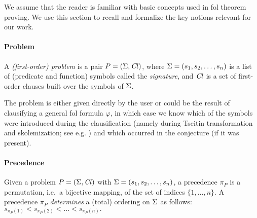 \documentclass[a4paper]{easychair}
\begin{document}

We assume that the reader is familiar with basic concepts used in \gls*{fol} theorem proving.
We use this section to recall and formalize the key notions relevant for our work.



\paragraph{Problem}
A \emph{(first-order) problem} is a pair \(P = (\operatorname{\Sigma}, \operatorname{\mathit{Cl}})\),
where \(\operatorname{\Sigma} = (s_1, s_2, \ldots, s_n)\) is a list of (predicate and function) symbols called the \emph{signature},
and \(\operatorname{\mathit{Cl}}\) is a set of first-order
clauses built over the symbols of \(\operatorname{\Sigma}\).

The problem is either given directly by the user or 
could be the result of clausifying a general \gls*{fol} formula \(\varphi\),
in which case we know which of the symbols were introduced during the clausification
(namely during Tseitin transformation and skolemization; see e.g. \citet{DBLP:books/el/RV01/NonnengartW01})
and which occurred in the conjecture (if it was present).

\paragraph{Precedence}
Given a problem \(P = (\operatorname{\Sigma}, \operatorname{\mathit{Cl}})\) with \(\operatorname{\Sigma} = (s_1, s_2, \ldots, s_n)\),
a precedence \(\pi_P\) is a permutation, i.e.~a bijective mapping, of the set of indices \(\{1,\ldots,n\}\).
A precedence \(\pi_P\) \emph{determines} a (total) ordering on \(\operatorname{\Sigma}\) as follows:
\(s_{\pi_P(1)} < s_{\pi_P(2)} < \ldots < s_{\pi_P(n)}.\)
\end{document}
